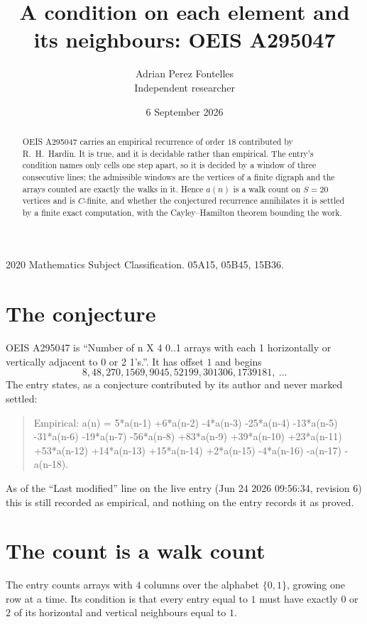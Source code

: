 \documentclass[11pt,a4paper]{article}
\title{A condition on each element and its neighbours: OEIS A295047}
\author{Adrian Perez Fontelles\\ \small Independent researcher}
\date{6 September 2026}
\theoremstyle{plain}
\theoremstyle{definition}
\begin{document}
\maketitle

\begin{abstract}
OEIS A295047 carries an empirical recurrence of order $18$ contributed by R.~H.~Hardin. It is
true, and it is decidable rather than empirical. The entry's condition names only cells one step apart, so it is decided by a window of
three consecutive lines; the
admissible windows are the vertices of a finite digraph and the arrays counted are exactly the
walks in it. Hence $a(n)$ is a walk count on $S=20$ vertices and is $C$-finite, and whether the
conjectured recurrence annihilates it is settled by a finite exact computation, with the
Cayley--Hamilton theorem bounding the work.
\end{abstract}

\noindent\small 2020 Mathematics Subject Classification. 05A15, 05B45, 15B36.\normalsize

\section{The conjecture}

OEIS A295047 is ``Number of n X 4 0..1 arrays with each 1 horizontally or vertically adjacent to 0 or 2 1's.''. It has offset $1$ and begins
\[
8, 48, 270, 1569, 9045, 52199, 301306, 1739181,\ \dots
\]
The entry states, as a conjecture contributed by its author and never marked settled:
\begin{quote}
Empirical: a(n) = 5*a(n-1) +6*a(n-2) -4*a(n-3) -25*a(n-4) -13*a(n-5) -31*a(n-6) -19*a(n-7) -56*a(n-8) +83*a(n-9) +39*a(n-10) +23*a(n-11) +53*a(n-12) +14*a(n-13) +15*a(n-14) +2*a(n-15) -4*a(n-16) -a(n-17) -a(n-18).
\end{quote}
As of the ``Last modified'' line on the live entry (Jun 24 2026 09:56:34, revision 6) this is still
recorded as empirical, and nothing on the entry records it as proved.

\section{The count is a walk count}

The entry counts arrays with $4$ columns over the alphabet $\{0,1\}$, growing one row at a time. Its condition is that every entry equal to $1$ must have exactly $0$ or $2$ of its horizontal and vertical neighbours equal to $1$.
\end{document}
